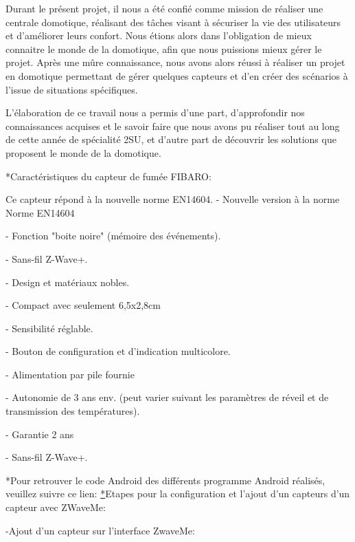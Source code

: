 Durant le présent projet, il nous a été confié comme mission de réaliser une centrale domotique, réalisant des tâches visant à sécuriser la vie des utilisateurs et d'améliorer leurs confort. Nous étions alors dans l'obligation de mieux connaitre le monde de la domotique, afin que nous puissions mieux gérer le projet. Après une mûre connaissance, nous avons alors réussi à réaliser un projet en domotique permettant de gérer quelques capteurs et d'en créer des scénarios à l'issue de situations spécifiques.\newline

L'élaboration de ce travail nous a permis d'une part, d'approfondir nos connaissances acquises et le savoir faire que nous avons pu réaliser tout au long de cette année de spécialité 2SU, et d'autre part de découvrir les solutions que proposent le monde de la domotique.\newline

*Caractéristiques du capteur de fumée FIBARO:

 
Ce capteur répond à la nouvelle norme EN14604. -    Nouvelle version à la norme Norme EN14604


-    Fonction "boite noire" (mémoire des événements).


-    Sans-fil Z-Wave+.


-    Design et matériaux nobles.


-    Compact avec seulement 6,5x2,8cm


-    Sensibilité réglable.


-    Bouton de configuration et d'indication multicolore.


-    Alimentation par pile fournie 


-    Autonomie de 3 ans env. (peut varier suivant les paramètres de réveil et de transmission des températures).


-    Garantie 2 ans


-    Sans-fil Z-Wave+.

*Pour retrouver le code Android des différents programme Android réalisés, veuillez suivre ce lien:  \href{https://github.com/marcMunier/INSAdom/tree/master/InsaDomApp}


*Etapes pour la configuration et l'ajout d'un capteurs d'un capteur avec ZWaveMe:


-Ajout d'un capteur sur l'interface ZwaveMe:


